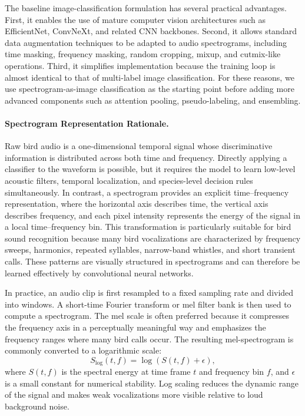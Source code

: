 \documentclass[a4paper,12pt]{article}
\begin{document}
The baseline image-classification formulation has several practical advantages. First, it enables the use of mature computer vision architectures such as EfficientNet, ConvNeXt, and related CNN backbones. Second, it allows standard data augmentation techniques to be adapted to audio spectrograms, including time masking, frequency masking, random cropping, mixup, and cutmix-like operations. Third, it simplifies implementation because the training loop is almost identical to that of multi-label image classification. For these reasons, we use spectrogram-as-image classification as the starting point before adding more advanced components such as attention pooling, pseudo-labeling, and ensembling.



\paragraph*{Spectrogram Representation Rationale.}

Raw bird audio is a one-dimensional temporal signal whose discriminative information is distributed across both time and frequency. Directly applying a classifier to the waveform is possible, but it requires the model to learn low-level acoustic filters, temporal localization, and species-level decision rules simultaneously. In contrast, a spectrogram provides an explicit time--frequency representation, where the horizontal axis describes time, the vertical axis describes frequency, and each pixel intensity represents the energy of the signal in a local time--frequency bin. This transformation is particularly suitable for bird sound recognition because many bird vocalizations are characterized by frequency sweeps, harmonics, repeated syllables, narrow-band whistles, and short transient calls. These patterns are visually structured in spectrograms and can therefore be learned effectively by convolutional neural networks.

In practice, an audio clip is first resampled to a fixed sampling rate and divided into windows. A short-time Fourier transform or mel filter bank is then used to compute a spectrogram. The mel scale is often preferred because it compresses the frequency axis in a perceptually meaningful way and emphasizes the frequency ranges where many bird calls occur. The resulting mel-spectrogram is commonly converted to a logarithmic scale:
\[
S_{\log}(t,f)=\log\left(S(t,f)+\epsilon\right),
\]
where $S(t,f)$ is the spectral energy at time frame $t$ and frequency bin $f$, and $\epsilon$ is a small constant for numerical stability. Log scaling reduces the dynamic range of the signal and makes weak vocalizations more visible relative to loud background noise.
\end{document}
